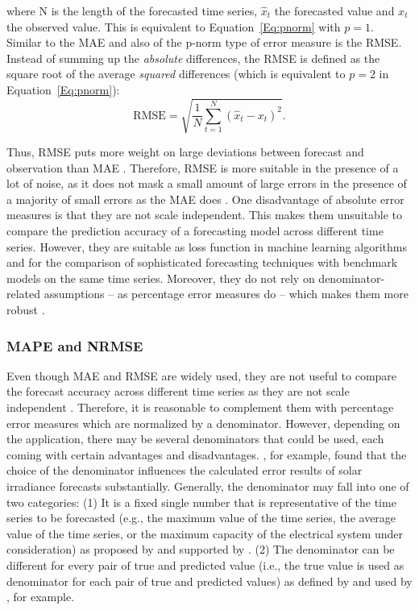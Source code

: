 \noindent where N is the length of the forecasted time series, $\widehat{x}_t$ the forecasted value and $x_t$ the observed value. This is equivalent to Equation~\ref{Eq:pnorm} with $p=1$. Similar to the MAE and also of the p-norm type of error measure is the RMSE. Instead of summing up the \textit{absolute} differences, the RMSE is defined as the square root of the average \textit{squared} differences (which is equivalent to $p=2$ in Equation~\ref{Eq:pnorm}):
%
\begin{equation} \label{Eq:RMSE}
\text{RMSE}=\sqrt{\frac{1}{N}\sum_{t=1}^N\left(\widehat{x}_t-x_t\right)^2}.
\end{equation}

\noindent Thus, RMSE puts more weight on large deviations between forecast and observation than MAE \citep{Meer:2018}. Therefore, RMSE is more suitable in the presence of a lot of noise, as it does not mask a small amount of large errors in the presence of a majority of small errors as the MAE does \citep{Zhang:2015}. One disadvantage of absolute error measures is that they are not scale independent. This makes them unsuitable to compare the prediction accuracy of a forecasting model across different time series. However, they are suitable as loss function in machine learning algorithms and for the comparison of sophisticated forecasting techniques with benchmark models on the same time series. Moreover, they do not rely on denominator-related assumptions -- as percentage error measures do -- which makes them more robust \citep{Hoff:2013}.


\subsubsection{MAPE and NRMSE}

Even though MAE and RMSE are widely used, they are not useful to compare the forecast accuracy across different time series as they are not scale independent \citep{Meer:2018}. Therefore, it is reasonable to complement them with percentage error measures which are normalized by a denominator. However, depending on the application, there may be several denominators that could be used, each coming with certain advantages and disadvantages. \citet{Hoff:2013}, for example, found that the choice of the denominator influences the calculated error results of solar irradiance forecasts substantially. Generally, the denominator may fall into one of two categories: (1) It is a fixed single number that is representative of the time series to be forecasted (e.g., the maximum value of the time series, the average value of the time series, or the maximum capacity of the electrical system under consideration) as proposed by \citet{Hoff:2013} and supported by \citet{Meer:2018}. (2) The denominator can be different for every pair of true and predicted value (i.e., the true value is used as denominator for each pair of true and predicted values) as defined by \citet{Hyndman:2006} and used by \citet{xie:2018}, for example. 

